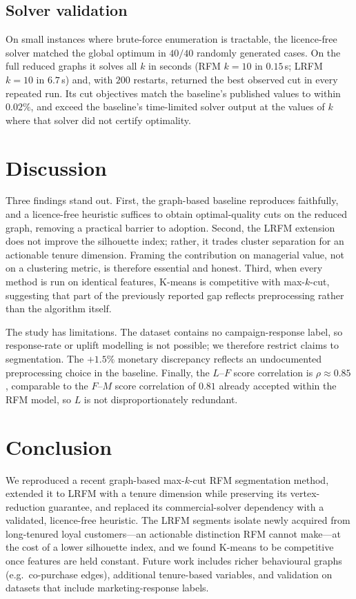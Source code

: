 \documentclass[pdflatex,sn-mathphys-num]{sn-jnl}%
\begin{document}
\subsection{Solver validation}\label{subsec:solverval}
On small instances where brute-force enumeration is tractable, the licence-free solver matched the global optimum in $40/40$ randomly generated cases. On the full reduced graphs it solves all $k$ in seconds (RFM $k{=}10$ in $0.15$\,s; LRFM $k{=}10$ in $6.7$\,s) and, with $200$ restarts, returned the best observed cut in every repeated run. Its cut objectives match the baseline's published values to within $0.02\%$, and exceed the baseline's time-limited solver output at the values of $k$ where that solver did not certify optimality.

\section{Discussion}\label{sec:discuss}
Three findings stand out. First, the graph-based baseline reproduces faithfully, and a licence-free heuristic suffices to obtain optimal-quality cuts on the reduced graph, removing a practical barrier to adoption. Second, the LRFM extension does not improve the silhouette index; rather, it trades cluster separation for an actionable tenure dimension. Framing the contribution on managerial value, not on a clustering metric, is therefore essential and honest. Third, when every method is run on identical features, K-means is competitive with max-$k$-cut, suggesting that part of the previously reported gap reflects preprocessing rather than the algorithm itself.

The study has limitations. The dataset contains no campaign-response label, so response-rate or uplift modelling is not possible; we therefore restrict claims to segmentation. The $+1.5\%$ monetary discrepancy reflects an undocumented preprocessing choice in the baseline. Finally, the $L$--$F$ score correlation is $\rho\approx0.85$, comparable to the $F$--$M$ score correlation of $0.81$ already accepted within the RFM model, so $L$ is not disproportionately redundant.

\section{Conclusion}\label{sec:conclusion}
We reproduced a recent graph-based max-$k$-cut RFM segmentation method, extended it to LRFM with a tenure dimension while preserving its vertex-reduction guarantee, and replaced its commercial-solver dependency with a validated, licence-free heuristic. The LRFM segments isolate newly acquired from long-tenured loyal customers---an actionable distinction RFM cannot make---at the cost of a lower silhouette index, and we found K-means to be competitive once features are held constant. Future work includes richer behavioural graphs (e.g.\ co-purchase edges), additional tenure-based variables, and validation on datasets that include marketing-response labels.
\end{document}
